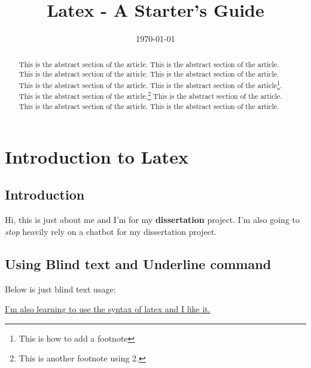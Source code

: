 \documentclass{report}
\title{\textbf{Latex - A Starter's Guide} }
\date{\today}
\theoremstyle{plain} %
\begin{document}
\linenumbers

\maketitle

\newpage
\tableofcontents 
\listoffigures
\listoftables
\chapter{Introduction to Latex}

\newpage

\begin{abstract} %
    This is the abstract section of the article. This is the abstract section of the article. This is the abstract section of the article. This is the abstract section of the article. This is the abstract section of the article. This is the abstract section of the article\footnote[1]{This is how to add a footnote }. This is the abstract section of the article.\footnote[2]{This is another footnote using 2.} This is the abstract section of the article. This is the abstract section of the article. This is the abstract section of the article.
\end{abstract}

\section{Introduction} \label{introduction}
Hi, this is just about me and I'm  for my \textbf{dissertation} project. I'm also going to \textit{stop} heavily rely on a chatbot for my dissertation project. 


\section{Using Blind text and Underline command}
Below is just blind text usage: \par
\textbf{\blindtext}

\underline{I'm also learning to use the syntax of latex and I like it.}

\end{document}
